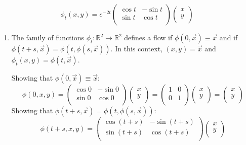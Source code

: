 \documentclass[12pt,letterpaper,reqno]{amsart}
\newcommand{\R}{\mathbb R}
\begin{document}
\begin{enumerate}
$$\phi_t(x,y) = e^{-2t}
\begin{pmatrix}
  \cos{t} & -\sin{t} \\
  \sin{t} & \cos{t} \\
\end{pmatrix}
\begin{pmatrix}
  x \\
  y \\
\end{pmatrix}$$
\newline
\begin{enumerate}
    \item The family of functions $\phi_t: \R^2\rightarrow\R^2$ defines a flow if $\phi(0,\vec{x}) \equiv \vec{x}$ and if $\phi(t+s,\vec{x}) = \phi(t,\phi(s,\vec{x}))$. In this context, $(x,y) = \vec{x}$ and $\phi_t(x,y) = \phi(t,\vec{x})$.
    
Showing that $\phi(0,\vec{x}) \equiv \vec{x}$:
$$\phi(0,x,y) = 
\begin{pmatrix}
  \cos{0} & -\sin{0} \\
  \sin{0} & \cos{0} \\
\end{pmatrix}
\begin{pmatrix}
  x \\
  y \\
\end{pmatrix} = 
\begin{pmatrix}
  1 & 0 \\
  0 & 1 \\
\end{pmatrix}
\begin{pmatrix}
  x \\
  y \\
\end{pmatrix} =
\begin{pmatrix}
  x \\
  y \\
\end{pmatrix}$$
\newline
Showing that $\phi(t+s,\vec{x}) = \phi(t,\phi(s,\vec{x}))$:
$$\phi(t+s,x,y) = 
\begin{pmatrix}
  \cos{(t+s)} & -\sin{(t+s)} \\
  \sin{(t+s)} & \cos{(t+s)} \\
\end{pmatrix}
\begin{pmatrix}
  x \\
  y \\
\end{pmatrix}$$


\end{enumerate}
\end{enumerate}
\end{document}
